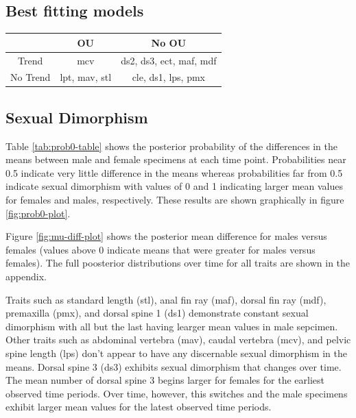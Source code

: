 \documentclass[
  12pt,
]{article}
\begin{document}
\hypertarget{best-fitting-models}{%
\subsection{Best fitting models}\label{best-fitting-models}}

\begin{table}[ht]
\centering
\begin{tabular}{|c||c|c|}
  \hline
 & OU & No OU  \\ 
  \hline
  \hline
Trend  &  mcv  & ds2, ds3, ect, maf, mdf \\ 
  \hline
  No Trend & lpt, mav, stl  &  cle, ds1, lps, pmx\\
   \hline
\end{tabular}
\label{whichmodel}
\end{table}

\hypertarget{sexual-dimorphism}{%
\subsection{Sexual Dimorphism}\label{sexual-dimorphism}}

Table \ref{tab:prob0-table} shows the posterior probability of the
differences in the means between male and female specimens at each time
point. Probabilities near 0.5 indicate very little difference in the
means whereas probabilities far from 0.5 indicate sexual dimorphism with
values of 0 and 1 indicating larger mean values for females and males,
respectively. These results are shown graphically in figure
\ref{fig:prob0-plot}.

Figure \ref{fig:mu-diff-plot} shows the posterior mean difference for
males versus females (values above 0 indicate means that were greater
for males versus females). The full poosterior distributions over time
for all traits are shown in the appendix.

Traits such as standard length (stl), anal fin ray (maf), dorsal fin ray
(mdf), premaxilla (pmx), and dorsal spine 1 (ds1) demonstrate constant
sexual dimorphism with all but the last having learger mean values in
male sepcimen. Other traits such as abdominal vertebra (mav), caudal
vertebra (mcv), and pelvic spine length (lps) don't appear to have any
discernable sexual dimorphism in the means. Dorsal spine 3 (ds3)
exhibits sexual dimorphism that changes over time. The mean number of
dorsal spine 3 begins larger for females for the earliest observed time
periods. Over time, however, this switches and the male specimens
exhibit larger mean values for the latest observed time periods.
\end{document}
